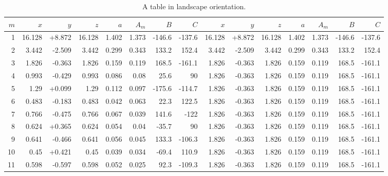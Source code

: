 \begin{landscape}
	\pagestyle{empty} %
	\begin{table}[h]
	\caption[A landscape table]{A table in landscape orientation.} 
	\begin{tabular}{rrrrrrrrrrrrrrr} \toprule
		\label{tab:land} 		
		{$m$} & {$x$} & {$y$} & {$z$} & {$a$} & {$A_m$} & {$B$} & {$C$} & {$x$} & {$y$} & {$z$} & {$a$} & {$A_m$} & {$B$} & {$C$} \\ \midrule
		1  & 16.128 & +8.872 & 16.128 & 1.402 & 1.373 & -146.6 & -137.6 & 16.128 & +8.872 & 16.128 & 1.402 & 1.373 & -146.6 & -137.6\\
		2  & 3.442  & -2.509 & 3.442  & 0.299 & 0.343 & 133.2  & 152.4 & 3.442  & -2.509 & 3.442  & 0.299 & 0.343 & 133.2  & 152.4 \\
		3  & 1.826  & -0.363 & 1.826  & 0.159 & 0.119 & 168.5  & -161.1 & 1.826  & -0.363 & 1.826  & 0.159 & 0.119 & 168.5  & -161.1 \\
		4  & 0.993  & -0.429 & 0.993  & 0.086 & 0.08  & 25.6   & 90 & 1.826  & -0.363 & 1.826  & 0.159 & 0.119 & 168.5  & -161.1    \\ \midrule
		5  & 1.29   & +0.099 & 1.29   & 0.112 & 0.097 & -175.6 & -114.7 & 1.826  & -0.363 & 1.826  & 0.159 & 0.119 & 168.5  & -161.1\\
		6  & 0.483  & -0.183 & 0.483  & 0.042 & 0.063 & 22.3   & 122.5 & 1.826  & -0.363 & 1.826  & 0.159 & 0.119 & 168.5  & -161.1 \\
		7  & 0.766  & -0.475 & 0.766  & 0.067 & 0.039 & 141.6  & -122 & 1.826  & -0.363 & 1.826  & 0.159 & 0.119 & 168.5  & -161.1  \\
		8  & 0.624  & +0.365 & 0.624  & 0.054 & 0.04  & -35.7  & 90  & 1.826  & -0.363 & 1.826  & 0.159 & 0.119 & 168.5  & -161.1   \\ \midrule
		9  & 0.641  & -0.466 & 0.641  & 0.056 & 0.045 & 133.3  & -106.3 & 1.826  & -0.363 & 1.826  & 0.159 & 0.119 & 168.5  & -161.1\\
		10 & 0.45   & +0.421 & 0.45   & 0.039 & 0.034 & -69.4  & 110.9  & 1.826  & -0.363 & 1.826  & 0.159 & 0.119 & 168.5  & -161.1\\
		11 & 0.598  & -0.597 & 0.598  & 0.052 & 0.025 & 92.3   & -109.3 & 1.826  & -0.363 & 1.826  & 0.159 & 0.119 & 168.5  & -161.1\\ \bottomrule
	\end{tabular}
	\end{table}
\end{landscape}

